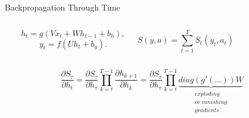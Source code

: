 \documentclass[xcolor=table]{beamer}
\begin{document}
\begin{frame}{Backpropagation Through Time}
\begin{columns}[c]
	$$	\qquad h_t = g(V x_t + W h_{t-1} + b_h),$$
	$$	\qquad y_t = f(U h_t + b_y).$$

	\[
		S(y, a) = \sum_{t = 1}^T S_t(y_t, a_t)
	\]

	\end{columns}


	\vspace{1cm}
	\[
		\frac{\partial S_\tau}{\partial h_t} = \frac{\partial S_\tau}{\partial h_\tau} \prod_{k = t}^{T-1} \frac{\partial h_{k+1}}{\partial h_k} = \frac{\partial S_\tau}{\partial h_\tau} \prod_{k = t}^{T-1} \underbrace{diag\left(g'(\dots)\right)W}_{\substack{exploding\\ or\ vanishing\\gradients}}
	\]
	
\end{frame}
\end{document}
